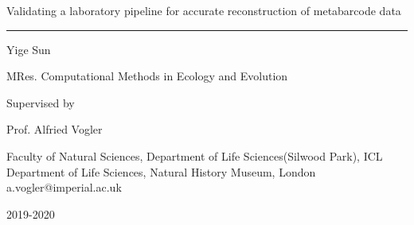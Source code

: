 \documentclass[11pt, a4paper]{article}
\begin{document}
 

\begin{titlepage} 
\nolinenumbers %
	\centering 

	
	\vspace*{\baselineskip} 
	

	\vspace{0.75\baselineskip} %
	
	{\LARGE Validating a laboratory pipeline for accurate reconstruction of metabarcode data} %
	
	\vspace{0.5\baselineskip} %
	
	\rule{\textwidth}{1.6pt} %
	
	\vspace{2\baselineskip} %
	
	
	{\Large Yige Sun} %
	\vspace*{0.5\baselineskip} %
	
	MRes. Computational Methods in Ecology and Evolution
	\vspace*{3\baselineskip} %
	
	
	Supervised by

	\vspace{0.5\baselineskip} %
	
	{\Large Prof. Alfried Vogler} %
	
	\vspace{0.5\baselineskip} %
	
	{Faculty of Natural Sciences, Department of Life Sciences(Silwood Park), ICL\\
	Department of Life Sciences, Natural History Museum, London\\
	a.vogler@imperial.ac.uk} 
	
	\vfill %
	
	{\LARGE 2019-2020} 
	\vspace{1\baselineskip}
\end{titlepage}
\end{document}
